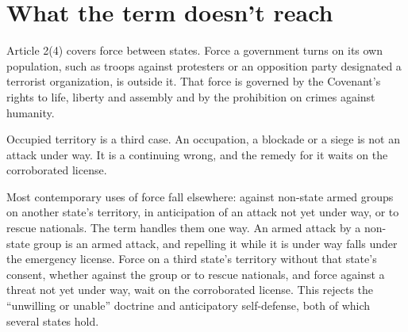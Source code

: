 \section{What the term doesn't reach}
\label{sec:6.6}
Article 2(4) covers force between states. Force a government turns on its own population, such as troops against protesters or an opposition party designated a terrorist organization, is outside it. That force is governed by the Covenant's rights to life, liberty and assembly and by the prohibition on crimes against humanity.

Occupied territory is a third case.
An occupation, a blockade or a siege is not an attack under way. It is a continuing wrong, and the remedy for it waits on the corroborated license.

Most contemporary uses of force fall elsewhere: against non-state armed groups on another state's territory, in anticipation of an attack not yet under way, or to rescue nationals. The term handles them one way. An armed attack by a non-state group is an armed attack, and repelling it while it is under way falls under the emergency license. Force on a third state's territory without that state's consent, whether against the group or to rescue nationals, and force against a threat not yet under way, wait on the corroborated license. This rejects the “unwilling or unable” doctrine and anticipatory self-defense, both of which several states hold.
